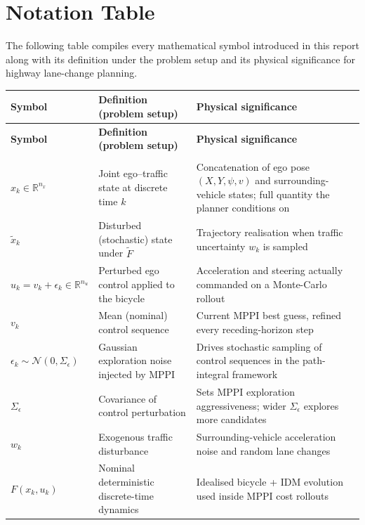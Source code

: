 \documentclass[letterpaper, 10 pt, conference]{ieeeconf}  %
\begin{document}
\appendix
\section{Notation Table}
The following table compiles every mathematical symbol introduced in this report along with its definition under the problem setup and its physical significance for highway lane-change planning.

\begin{longtable}{|>{\raggedright\arraybackslash}p{}|>{\raggedright\arraybackslash}p{}|>{\raggedright\arraybackslash}p{}|}
\hline
\textbf{Symbol} & \textbf{Definition (problem setup)} & \textbf{Physical significance} \\
\hline
\endfirsthead
\hline
\textbf{Symbol} & \textbf{Definition (problem setup)} & \textbf{Physical significance} \\
\hline
\endhead
\hline
\multicolumn{3}{|l|}{\textit{State, control, and dynamics}} \\
\hline
$x_k\!\in\!\mathbb{R}^{n_x}$ & Joint ego--traffic state at discrete time $k$ & Concatenation of ego pose $(X,Y,\psi,v)$ and surrounding-vehicle states; full quantity the planner conditions on \\
\hline
$\tilde{x}_k$ & Disturbed (stochastic) state under $\tilde F$ & Trajectory realisation when traffic uncertainty $w_k$ is sampled \\
\hline
$u_k\!=\!v_k\!+\!\epsilon_k\!\in\!\mathbb{R}^{n_u}$ & Perturbed ego control applied to the bicycle & Acceleration and steering actually commanded on a Monte-Carlo rollout \\
\hline
$v_k$ & Mean (nominal) control sequence & Current MPPI best guess, refined every receding-horizon step \\
\hline
$\epsilon_k\!\sim\!\mathcal{N}(0,\Sigma_\epsilon)$ & Gaussian exploration noise injected by MPPI & Drives stochastic sampling of control sequences in the path-integral framework \\
\hline
$\Sigma_\epsilon$ & Covariance of control perturbation & Sets MPPI exploration aggressiveness; wider $\Sigma_\epsilon$ explores more candidates \\
\hline
$w_k$ & Exogenous traffic disturbance & Surrounding-vehicle acceleration noise and random lane changes \\
\hline
$F(x_k,u_k)$ & Nominal deterministic discrete-time dynamics & Idealised bicycle + IDM evolution used inside MPPI cost rollouts \\

\end{longtable}
\end{document}
